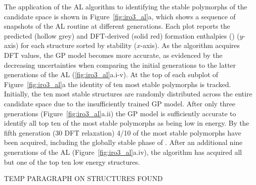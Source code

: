 %
The application of the AL algorithm to identifying the stable polymorphs of the \IrOthree candidate space is shown in
Figure~\ref{fig:iro3_al}a,
which shows a sequence of snapshots of the AL routine at different generations.
%
Each plot reports the predicted (hollow grey) and DFT-derived (solid red) formation enthalpies (\DHf) ($y$-axis) for each structure sorted by stability ($x$-axis).
%
As the algorithm acquires DFT \DHf values, the GP model becomes more accurate, as evidenced by the decreasing uncertainties when comparing the initial generations to the latter generations of the AL (\ref{fig:iro3_al}a.i-v).
%
At the top of each subplot of Figure~\ref{fig:iro3_al}a the identity of ten most stable polymorphs is tracked.
%
Initially, the ten most stable structures are randomly distributed across the entire candidate space due to the insufficiently trained GP model.
%
After only three generations (Figure~\ref{fig:iro3_al}a.ii) the GP model is sufficiently accurate to identify all top ten of the most stable polymorphs as being low in energy.
%
By the fifth generation (\num{30} DFT relaxation) \num{4/10} of the most stable polymorphs have been acquired,
including the globally stable phase of \IrOthree.
%
After an additional nine generations of the AL
(Figure~\ref{fig:iro3_al}a.iv),
the algorithm has acquired all but one of the top ten low energy structures.


%
TEMP PARAGRAPH ON STRUCTURES FOUND



